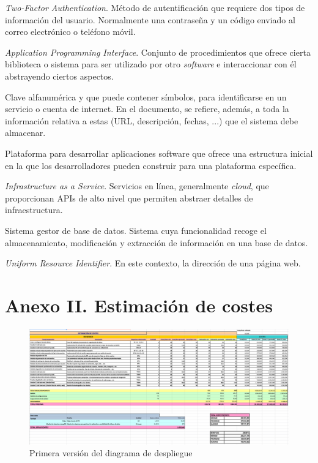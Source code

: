 \documentclass{article}
\begin{document}
\begin{description}
    \setlength\itemsep{0em}
    \item[2FA] \textit{Two-Factor Authentication}. Método de autentificación que requiere dos tipos de información del usuario. Normalmente una contraseña y un código enviado al correo electrónico o teléfono móvil.
    \item[API] \textit{Application Programming Interface}. Conjunto de procedimientos que ofrece cierta biblioteca o sistema para ser utilizado por otro \textit{software} e interaccionar con él abstrayendo ciertos aspectos.
    \item[Contraseña] Clave alfanumérica y que puede contener símbolos, para identificarse en un servicio o cuenta de internet. En el documento, se refiere, además, a toda la información relativa a estas (URL, descripción, fechas, ...) que el sistema debe almacenar.
    \item[Framework] Plataforma para desarrollar aplicaciones software que ofrece una estructura inicial en la que los desarrolladores pueden construir para una plataforma específica. 
    \item[IaaS] \textit{Infrastructure as a Service}. Servicios en línea, generalmente \textit{cloud}, que proporcionan APIs de alto nivel que permiten abstraer detalles de infraestructura.
    \item[SGBD] Sistema gestor de base de datos. Sistema cuya funcionalidad recoge el almacenamiento, modificación y extracción de información en una base de datos.
    \item[URL] \textit{Uniform Resource Identifier}. En este contexto, la dirección de una página web. 
\end{description}

\pagebreak

\section*{Anexo II. Estimación de costes}

\begin{figure}[H]
    \centering
    \begin{adjustbox}{max size={\textwidth}{\textheight-5em}}
        \includegraphics[angle=90]{../images/propuesta_economica.png}
    \end{adjustbox}
    \caption{Primera versión del diagrama de despliegue}
    \label{despliegueV1}
\end{figure}


\end{document}
